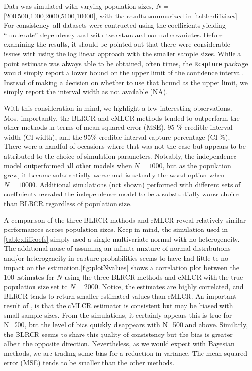 \documentclass[
  12pt,
]{article}
\begin{document}
Data was simulated with varying population sizes,
\(N=\){[}200,500,1000,2000,5000,10000{]}, with the results summarized in
\autoref{table:diffsizes}. For consistency, all datasets were contructed
using the coefficients yielding ``moderate'' dependency and with two
standard normal covariates. Before examining the results, it should be
pointed out that there were considerable issues with using the log
linear approach with the smaller sample sizes. While a point estimate
was always able to be obtained, often times, the \texttt{Rcapture}
package would simply report a lower bound on the upper limit of the
confidence interval. Instead of making a decision on whether to use that
bound as the upper limit, we simply report the interval width as not
available (NA).

With this consideration in mind, we highlight a few interesting
observations. Most importantly, the BLRCR and cMLCR methods tended to
outperform the other methods in terms of mean squared error (MSE), 95
\(\%\) credible interval width (CI width), and the 95\(\%\) credible
interval capture percentage (CI \(\%\)). There were a handful of
occasions where that was not the case but appears to be attributed to
the choice of simulation parameters. Noteably, the independence model
outperformed all other models when \(N=1000\), but as the population
grew, it became substantially worse and is actually the worst option
when \(N=10000\). Additional simulations (not shown) performed with
different sets of coefficients revealed the independence model to be a
substantially worse choice than BLRCR regardless of population size.

A comparison of the three BLRCR methods and cMLCR reveal relatively
similar performances across population sizes. Keep in mind, the
simulation used in \autoref{table:diffcoefs} simply used a single
multivariate normal with no heterogeneity. The additional noise of
assuming an infinite mixture of normal distributions and/or
heterogeneity in capture probabilities seems to have had little to no
impact on the estimation.\autoref{fig:plotNvalues} shows a correlation
plot between the 100 estimates for \(N\) using the three BLRCR methods
and cMLCR with the true population size set to \(N=2000\). Notice, the
estimates are highly correlated, and BLRCR tends to return smaller
estimated values than cMLCR. An important result of
\cite{alho_logistic_1990}, is that the cMLCR estimator is consistent but
may be biased with small sample sizes. From the simulations, it
certainly appears this is true for N=200, but the level of bias quickly
disappears with N=500 and above. Similarly, the BLRCR seems to share
this quality of consistency but the bias is greater albeit the opposite
direction. Nevertheless, as we would expect with Bayesian methods, we
are trading some bias for a reduction in variance. The mean squared
error (MSE) tends to be smaller than the other methods.
\end{document}
